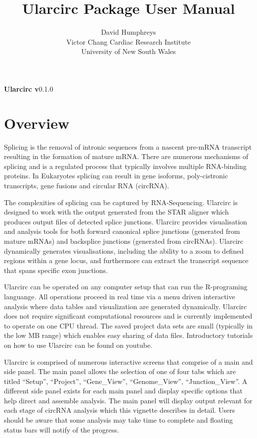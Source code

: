 \documentclass[12pt]{article}\usepackage[]{graphicx}\usepackage[]{color}
\title{Ularcirc Package User Manual}
\author{David Humphreys\\
Victor Chang Cardiac Research Institute\\
University of New South Wales
}
\begin{document}
\maketitle

\begin{center}
\textbf{Ularcirc v}0.1.0
\end{center}

\tableofcontents



\section{Overview} \label{sec:praeludium}

\indent Splicing is the removal of intronic sequences from a nascent pre-mRNA transcript resulting in the formation of mature mRNA. There are numerous mechanisms of splicing and is a regulated process that typically involves multiple RNA-binding proteins. In Eukaryotes splicing can result in gene isoforms, poly-cistronic transcripts, gene fusions and circular RNA (circRNA). \par
 The complexities of splicing  can be captured by RNA-Sequencing. Ularcirc is designed to work with the output generated from the STAR aligner which produces output files of detected splice junctions. Ularcirc provides visualisation and analysis tools for both forward canonical splice junctions (generated from mature mRNAs) and backsplice junctions (generated from circRNAs). Ularcirc dynamically generates visualisations, including the ability to a zoom to defined regions within a gene locus, and furthermore can extract the transcript sequence that spans specific exon junctions. \par
 Ularcirc can be operated on any computer setup that can run the R-programing languange. All operations proceed in real time via a menu driven interactive analysis where data tables and visualization are generated dynamically. Ularcirc does not require significant computational resources and is currently implemented to operate on one CPU thread. The saved project data sets are small (typically in the low MB range) which enables easy sharing of data files. Introductory tutorials on how to use Ularcirc can be found on youtube. \par
Ularcirc is comprised of numerous interactive screens that comprise of a main and side panel. The main panel allows the selection of one of four tabs which are titled ``Setup'', ``Project'', ``Gene\_View'', ``Genome\_View'', ``Junction\_View''. A different side panel exists for each main panel and display  specific options that help direct and assemble analysis. The main panel will display output relevant for each stage of circRNA analysis which this vignette describes in detail. Users should be aware that some analysis may take time to complete and floating status bars will notify of the progress.
\end{document}
